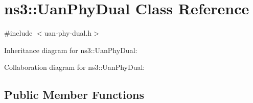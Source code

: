 \hypertarget{classns3_1_1UanPhyDual}{}\section{ns3\+:\+:Uan\+Phy\+Dual Class Reference}
\label{classns3_1_1UanPhyDual}


{\ttfamily \#include $<$uan-\/phy-\/dual.\+h$>$}



Inheritance diagram for ns3\+:\+:Uan\+Phy\+Dual\+:


Collaboration diagram for ns3\+:\+:Uan\+Phy\+Dual\+:
\subsection*{Public Member Functions}
